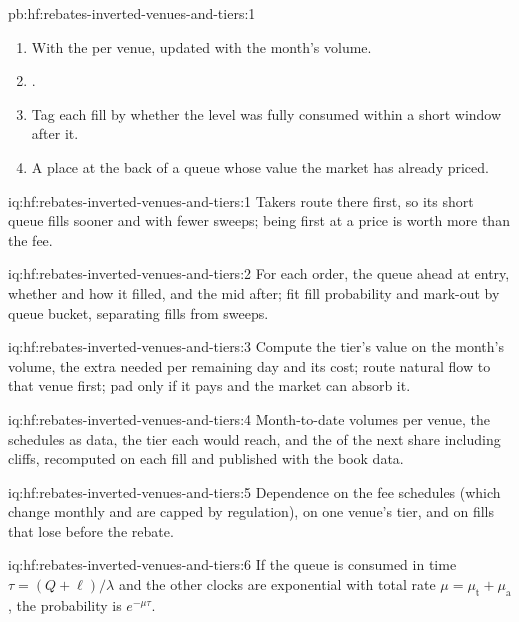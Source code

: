 \begin{solution}{pb:hf:rebates-inverted-venues-and-tiers:1}
\begin{enumerate}
\item With the  per venue, updated with the month's volume.
\item {}.
\item Tag each fill by whether the level was fully consumed within a short window after it.
\item A place at the back of a queue whose value the market has already priced.
\end{enumerate}
\end{solution}

\begin{solution}{iq:hf:rebates-inverted-venues-and-tiers:1}
Takers route there first, so its short queue fills sooner and with fewer sweeps; being first at a price is worth more than the fee.
\end{solution}

\begin{solution}{iq:hf:rebates-inverted-venues-and-tiers:2}
For each order, the queue ahead at entry, whether and how it filled, and the mid after; fit fill probability and mark-out by queue bucket,
separating fills from sweeps.
\end{solution}

\begin{solution}{iq:hf:rebates-inverted-venues-and-tiers:3}
Compute the tier's value on the month's volume, the extra needed per remaining day and its cost; route natural flow to that venue first; pad only if
it pays and the market can absorb it.
\end{solution}

\begin{solution}{iq:hf:rebates-inverted-venues-and-tiers:4}
Month-to-date volumes per venue, the schedules as data, the tier each would reach, and the  of the next share including cliffs,
recomputed on each fill and published with the book data.
\end{solution}

\begin{solution}{iq:hf:rebates-inverted-venues-and-tiers:5}
Dependence on the fee schedules (which change monthly and are capped by regulation), on one venue's tier, and on fills that lose before the rebate.
\end{solution}

\begin{solution}{iq:hf:rebates-inverted-venues-and-tiers:6}
If the queue is consumed in time $\tau=(Q+\ell)/\lambda$ and the other clocks are exponential with total rate $\mu=\mu_{\mathrm{t}}+\mu_{\mathrm{a}}$,
the probability is $e^{-\mu\tau}$.
\end{solution}
